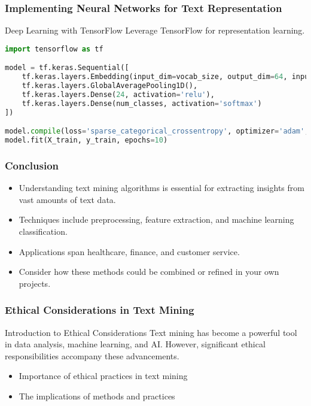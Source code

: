 \documentclass[aspectratio=169]{beamer}
\begin{document}
\begin{frame}[fragile]
    \frametitle{Implementing Neural Networks for Text Representation}
    \begin{block}{Deep Learning with TensorFlow}
        Leverage TensorFlow for representation learning.
    \end{block}

    \begin{lstlisting}[language=Python]
import tensorflow as tf

model = tf.keras.Sequential([
    tf.keras.layers.Embedding(input_dim=vocab_size, output_dim=64, input_length=max_length),
    tf.keras.layers.GlobalAveragePooling1D(),
    tf.keras.layers.Dense(24, activation='relu'),
    tf.keras.layers.Dense(num_classes, activation='softmax')
])

model.compile(loss='sparse_categorical_crossentropy', optimizer='adam', metrics=['accuracy'])
model.fit(X_train, y_train, epochs=10)
    \end{lstlisting}
\end{frame}

\begin{frame}
    \frametitle{Conclusion}
    \begin{itemize}
        \item Understanding text mining algorithms is essential for extracting insights from vast amounts of text data.
        \item Techniques include preprocessing, feature extraction, and machine learning classification.
        \item Applications span healthcare, finance, and customer service.
        \item Consider how these methods could be combined or refined in your own projects.
    \end{itemize}
\end{frame}

\begin{frame}[fragile]
    \frametitle{Ethical Considerations in Text Mining}
    
    \begin{block}{Introduction to Ethical Considerations}
        Text mining has become a powerful tool in data analysis, machine learning, and AI. However, significant ethical responsibilities accompany these advancements.
    \end{block}
    \begin{itemize}
        \item Importance of ethical practices in text mining
        \item The implications of methods and practices
    \end{itemize}
\end{frame}
\end{document}

